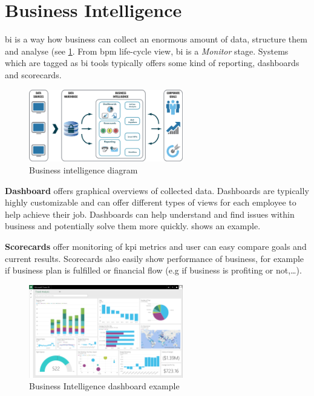 \section{Business Intelligence}

\gls{bi} is a way how business can collect an enormous amount of data, structure them and analyse (see \cref{fig:bi-diagram}. From \gls{bpm} life-cycle view, \gls{bi} is a \textit{Monitor} stage. Systems which are tagged as \gls{bi} tools typically offers some kind of reporting, dashboards and scorecards. 

\begin{figure}[ht!]
	\centering
    \includegraphics[width=0.6\textwidth]{img/mortgage-business-intelligence-diagram.png}
    \caption{Business intelligence diagram \cite{business-intelligence-diagram-2018}}
    \label{fig:bi-diagram}
\end{figure}

\textbf{Dashboard} offers graphical overviews of collected data. Dashboards are typically highly customizable and can offer different types of views for each employee to help achieve their job. Dashboards can help understand and find issues within business and potentially solve them more quickly.  shows an example. 

\textbf{Scorecards} offer monitoring of \gls{kpi} metrics and user can easy compare goals and current results. Scorecards also easily show performance of business, for example if business plan is fulfilled or financial flow (e.g if business is profiting or not,\dots). 

\begin{figure}[ht!]
	\centering
    \includegraphics[width=0.6\textwidth]{img/microsoft-power-bi-dashboard.png}
    \caption{Business Intelligence dashboard example~\cite{ms-business-intelligence-2018}}
    \label{fig:bi-dashboard}
\end{figure}

